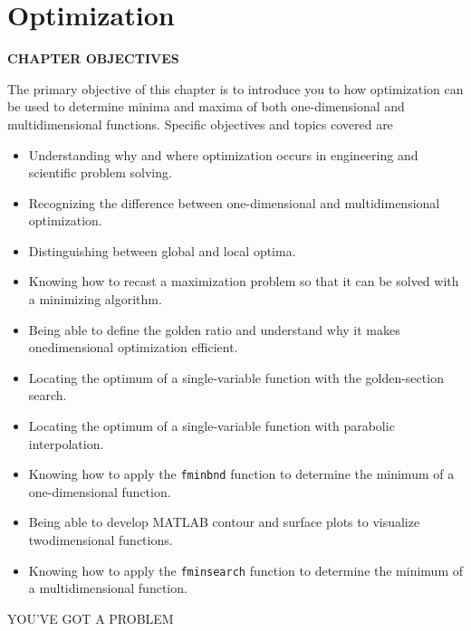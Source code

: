 \documentclass[../main.tex]{subfiles}
\begin{document}
\chapter{Optimization}
\label{cha:cha_7}
\begin{center}
\Large{\textbf{CHAPTER OBJECTIVES}}
\end{center}

The primary objective of this chapter is to introduce you to how optimization can be
used to determine minima and maxima of both one-dimensional and multidimensional
functions. Specific objectives and topics covered are
\begin{itemize}
\item Understanding why and where optimization occurs in engineering and scientific
problem solving.
\item Recognizing the difference between one-dimensional and multidimensional
optimization.
\item Distinguishing between global and local optima.
\item Knowing how to recast a maximization problem so that it can be solved with a
minimizing algorithm.
\item Being able to define the golden ratio and understand why it makes onedimensional
optimization efficient.
\item Locating the optimum of a single-variable function with the golden-section search.
\item Locating the optimum of a single-variable function with parabolic interpolation.
\item Knowing how to apply the \texttt{fminbnd} function to determine the minimum of a
one-dimensional function.
\item Being able to develop MATLAB contour and surface plots to visualize twodimensional
functions.
\item Knowing how to apply the \texttt{fminsearch} function to determine the minimum of a
multidimensional function.

\end{itemize}

\newpage

\Large{YOU'VE GOT A PROBLEM}
\end{document}
